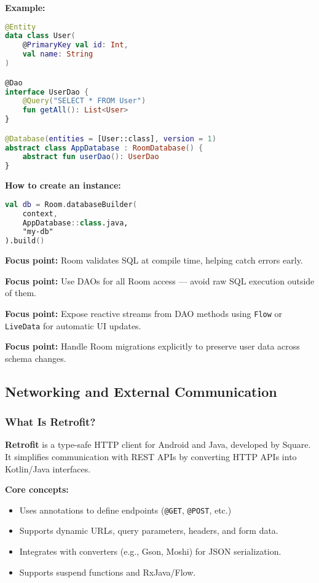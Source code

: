 \documentclass[a4paper,12pt]{article}
\begin{document}
\textbf{Example:}
\begin{lstlisting}[language=Kotlin]
@Entity
data class User(
    @PrimaryKey val id: Int,
    val name: String
)

@Dao
interface UserDao {
    @Query("SELECT * FROM User")
    fun getAll(): List<User>
}

@Database(entities = [User::class], version = 1)
abstract class AppDatabase : RoomDatabase() {
    abstract fun userDao(): UserDao
}
\end{lstlisting}

\textbf{How to create an instance:}
\begin{lstlisting}[language=Kotlin]
val db = Room.databaseBuilder(
    context,
    AppDatabase::class.java,
    "my-db"
).build()
\end{lstlisting}

\textbf{Focus point:} Room validates SQL at compile time, helping catch errors early.

\textbf{Focus point:} Use DAOs for all Room access — avoid raw SQL execution outside of them.

\textbf{Focus point:} Expose reactive streams from DAO methods using \texttt{Flow} or \texttt{LiveData} for automatic UI updates.

\textbf{Focus point:} Handle Room migrations explicitly to preserve user data across schema changes.


\subsection{Networking and External Communication}

\subsubsection{What Is Retrofit?}

\textbf{Retrofit} is a type-safe HTTP client for Android and Java, developed by Square. It simplifies communication with REST APIs by converting HTTP APIs into Kotlin/Java interfaces.

\textbf{Core concepts:}
\begin{itemize}
  \item Uses annotations to define endpoints (\texttt{@GET}, \texttt{@POST}, etc.)
  \item Supports dynamic URLs, query parameters, headers, and form data.
  \item Integrates with converters (e.g., Gson, Moshi) for JSON serialization.
  \item Supports suspend functions and RxJava/Flow.
\end{itemize}
\end{document}
